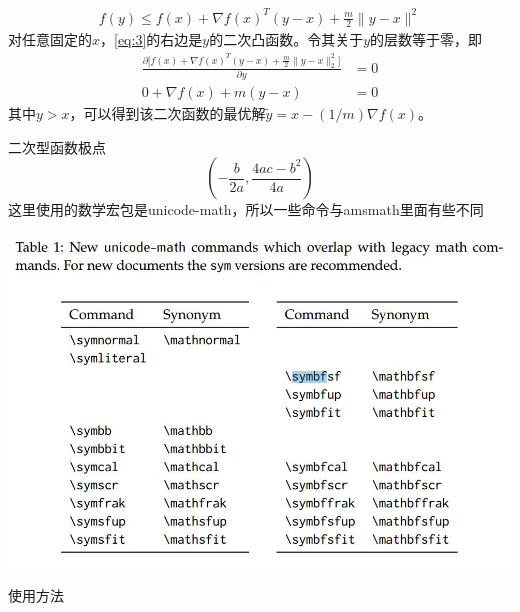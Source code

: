 \documentclass{lsbook}
\begin{document}
\begin{align}\label{eq:3}
f(y) \leqslant f(x) + \nabla f(x)^T(y-x) + \frac{m}{2}\|y-x\|^2
\end{align}
对任意固定的$x$，\cref{eq:3}的右边是$y$的二次凸函数。令其关于$y$的层数等于零，即
\begin{align}\label{eq:4}
\frac{\partial\bigl[f(x) + \nabla f(x)^T(y-x) + \frac{m}{2}\|y-x\|_2^2\bigr]}{\partial y} &= 0\\
0 + \nabla f(x) + m(y-x) &=0\label{eq:5}
\end{align}
其中$y>x$，可以得到该二次函数的最优解$\tilde{y}=x-(1/m)\nabla f(x)$。

二次型函数极点
\[\left(-\frac{b}{2a},\frac{4ac-b^2}{4a}\right)\]
这里使用的数学宏包是unicode-math，所以一些命令与amsmath里面有些不同

\includegraphics[width=0.7\linewidth]{unimath}
\begin{langCVOne}{使用方法}
\end{langCVOne}

\makebackcover
\end{document}
